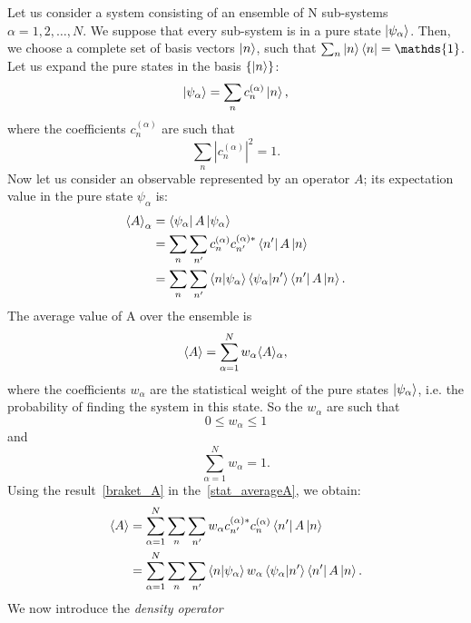 Let us consider a system consisting of an ensemble of N sub-systems $\alpha = 1, 2, \dots , N$. We suppose that every sub-system is in a pure state $\ket{\psi_\alpha}$. Then, we choose a complete set of basis vectors $\ket{n}$, such that $\sum_n \ket{n}\bra{n} = \mathds{1}$. Let us expand the pure states in the basis $\{\ket{n}\}$:
\begin{equation*}
    \ket{\psi_\alpha} = \sum_n c_n^{(\alpha)}\ket{n},
\end{equation*}
where the coefficients $c_n^{(\alpha)}$ are such that
\begin{equation*}
    \sum_n |c_n^{(\alpha)}|^2 = 1.
\end{equation*}
Now let us consider an observable represented by an operator $A$; its expectation value in the pure state $\psi_\alpha$ is:
\begin{align}
    \braket{A}_\alpha &= \bra{\psi_\alpha}A\ket{\psi_\alpha} \\
                      \label{braket_A}
                      &= \sum_n \sum_{n'} c_n^{(\alpha)}c_{n'}^{(\alpha)*} \bra{n'}A\ket{n} \\
                      &= \sum_n \sum_{n'} \braket{n|\psi_\alpha}\braket{\psi_\alpha|n'} \bra{n'}A\ket{n}.
\end{align}
The average value of A over the ensemble is
\begin{equation}
\label{stat_averageA}
    \braket{A} = \sum_{\alpha = 1}^N w_\alpha \langle A \rangle_\alpha,
\end{equation}
where the coefficients $w_\alpha$ are the statistical weight of the pure states $\ket{\psi_\alpha}$, i.e. the probability of finding the system in this state. 
So the $w_\alpha$ are such that
\begin{equation}
\label{charact_weights}
    0 \leq w_\alpha \leq 1
\end{equation}
and 
\begin{equation*}
    \sum_{\alpha=1}^N w_\alpha = 1.
\end{equation*}
Using the result~\ref{braket_A} in the~\ref{stat_averageA}, we obtain:
\begin{align}
    \braket{A} &= \sum_{\alpha = 1}^N \sum_n \sum_{n'} w_\alpha c_{n'}^{(\alpha)*} c_n^{(\alpha)} \bra{n'}A\ket{n} \\
                \label{total_stat_average}
               &= \sum_{\alpha = 1}^N \sum_n \sum_{n'} \braket{n|\psi_\alpha}w_\alpha \braket{\psi_\alpha|n'} \bra{n'}A\ket{n}.
\end{align}
We now introduce the \emph{density operator}

